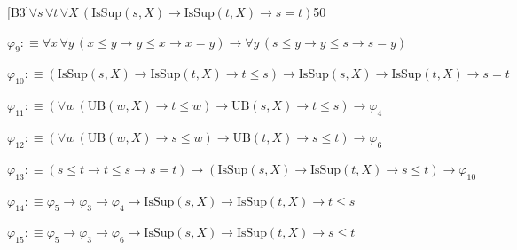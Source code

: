 \begin{fullproof}{[B3]}{$\forall s\,\forall t\,\forall X\,(\mathrm{IsSup}(s,X) \to \mathrm{IsSup}(t,X) \to s = t)$}{50}
\begin{abbrevlist}
\item $\varphi_{9} :\equiv \forall x\,\forall y\,(x \leq y \to y \leq x \to x = y) \to \forall y\,(s \leq y \to y \leq s \to s = y)$
\item $\varphi_{10} :\equiv (\mathrm{IsSup}(s,X) \to \mathrm{IsSup}(t,X) \to t \leq s) \to \mathrm{IsSup}(s,X) \to \mathrm{IsSup}(t,X) \to s = t$
\item $\varphi_{11} :\equiv (\forall w\,(\mathrm{UB}(w,X) \to t \leq w) \to \mathrm{UB}(s,X) \to t \leq s) \to \varphi_{4}$
\item $\varphi_{12} :\equiv (\forall w\,(\mathrm{UB}(w,X) \to s \leq w) \to \mathrm{UB}(t,X) \to s \leq t) \to \varphi_{6}$
\item $\varphi_{13} :\equiv (s \leq t \to t \leq s \to s = t) \to (\mathrm{IsSup}(s,X) \to \mathrm{IsSup}(t,X) \to s \leq t) \to \varphi_{10}$
\item $\varphi_{14} :\equiv \varphi_{5} \to \varphi_{3} \to \varphi_{4} \to \mathrm{IsSup}(s,X) \to \mathrm{IsSup}(t,X) \to t \leq s$
\item $\varphi_{15} :\equiv \varphi_{5} \to \varphi_{3} \to \varphi_{6} \to \mathrm{IsSup}(s,X) \to \mathrm{IsSup}(t,X) \to s \leq t$
\end{abbrevlist}
\end{fullproof}
